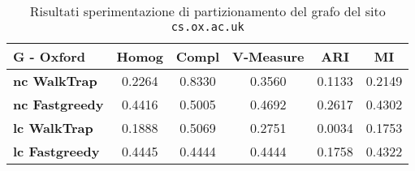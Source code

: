 \begin{table}[H]
	\begin{tabular}{| l | c | c | c | c | c |}
	\hline
	\textbf{G - Oxford}  & \textbf{Homog} & \textbf{Compl} & \textbf{V-Measure}  & \textbf{ARI}  & \textbf{MI} \\ [3ex] \hline
	\textbf{nc WalkTrap} & 0.2264 & 0.8330 & 0.3560 & 0.1133 & 0.2149 \\ [3ex]
	 \hline
	\textbf{nc Fastgreedy} & 0.4416 & 0.5005 & 0.4692 & 0.2617 & 0.4302 \\ [3ex]
	 \hline	
	\textbf{lc WalkTrap} & 0.1888 & 0.5069 & 0.2751 & 0.0034 & 0.1753 \\ [3ex]
	 \hline	
	\textbf{lc Fastgreedy} & 0.4445 & 0.4444 & 0.4444 & 0.1758 & 0.4322 \\ [3ex]
	\hline
	\end{tabular}
	\caption{Risultati sperimentazione di partizionamento del grafo del sito \texttt{cs.ox.ac.uk}}
	\label{metricheGraphOx}
\end{table}


